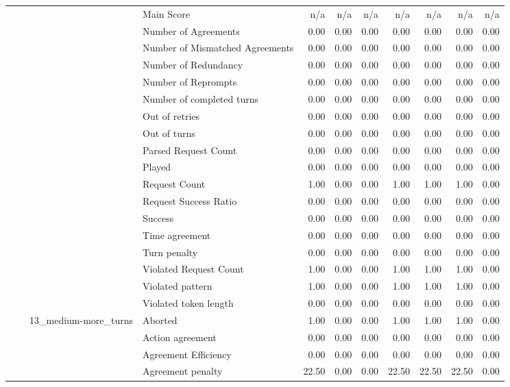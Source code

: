 \begin{tabular}{llllrrrrrrr}
 &  &  & Main Score & n/a & n/a & n/a & n/a & n/a & n/a & n/a \\
 &  &  & Number of Agreements & 0.00 & 0.00 & 0.00 & 0.00 & 0.00 & 0.00 & 0.00 \\
 &  &  & Number of Mismatched Agreements & 0.00 & 0.00 & 0.00 & 0.00 & 0.00 & 0.00 & 0.00 \\
 &  &  & Number of Redundancy & 0.00 & 0.00 & 0.00 & 0.00 & 0.00 & 0.00 & 0.00 \\
 &  &  & Number of Reprompts & 0.00 & 0.00 & 0.00 & 0.00 & 0.00 & 0.00 & 0.00 \\
 &  &  & Number of completed turns & 0.00 & 0.00 & 0.00 & 0.00 & 0.00 & 0.00 & 0.00 \\
 &  &  & Out of retries & 0.00 & 0.00 & 0.00 & 0.00 & 0.00 & 0.00 & 0.00 \\
 &  &  & Out of turns & 0.00 & 0.00 & 0.00 & 0.00 & 0.00 & 0.00 & 0.00 \\
 &  &  & Parsed Request Count & 0.00 & 0.00 & 0.00 & 0.00 & 0.00 & 0.00 & 0.00 \\
 &  &  & Played & 0.00 & 0.00 & 0.00 & 0.00 & 0.00 & 0.00 & 0.00 \\
 &  &  & Request Count & 1.00 & 0.00 & 0.00 & 1.00 & 1.00 & 1.00 & 0.00 \\
 &  &  & Request Success Ratio & 0.00 & 0.00 & 0.00 & 0.00 & 0.00 & 0.00 & 0.00 \\
 &  &  & Success & 0.00 & 0.00 & 0.00 & 0.00 & 0.00 & 0.00 & 0.00 \\
 &  &  & Time agreement & 0.00 & 0.00 & 0.00 & 0.00 & 0.00 & 0.00 & 0.00 \\
 &  &  & Turn penalty & 0.00 & 0.00 & 0.00 & 0.00 & 0.00 & 0.00 & 0.00 \\
 &  &  & Violated Request Count & 1.00 & 0.00 & 0.00 & 1.00 & 1.00 & 1.00 & 0.00 \\
 &  &  & Violated pattern & 1.00 & 0.00 & 0.00 & 1.00 & 1.00 & 1.00 & 0.00 \\
 &  &  & Violated token length & 0.00 & 0.00 & 0.00 & 0.00 & 0.00 & 0.00 & 0.00 \\
\cline{3-11}
 &  & \multirow[t]{27}{*}{13_medium-more_turns} & Aborted & 1.00 & 0.00 & 0.00 & 1.00 & 1.00 & 1.00 & 0.00 \\
 &  &  & Action agreement & 0.00 & 0.00 & 0.00 & 0.00 & 0.00 & 0.00 & 0.00 \\
 &  &  & Agreement Efficiency & 0.00 & 0.00 & 0.00 & 0.00 & 0.00 & 0.00 & 0.00 \\
 &  &  & Agreement penalty & 22.50 & 0.00 & 0.00 & 22.50 & 22.50 & 22.50 & 0.00 \\

\end{tabular}
